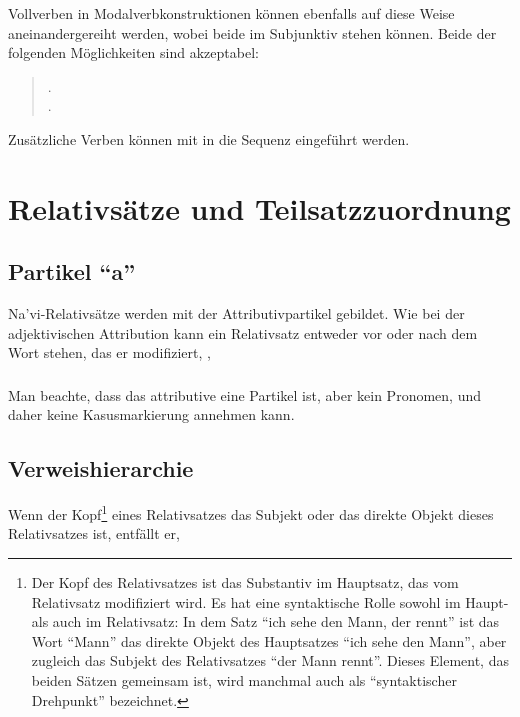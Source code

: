 Vollverben in Modalverbkonstruktionen können ebenfalls auf diese Weise aneinandergereiht werden, wobei beide im Subjunktiv stehen können. Beide der folgenden Möglichkeiten sind akzeptabel:

\begin{quotation}
	\noindent{} . \\
	\noindent{} .
\end{quotation}

\noindent Zusätzliche Verben können mit  in die Sequenz eingeführt werden. 

\section{Relativsätze und Teilsatzzuordnung}
\subsection{Partikel ``a''} Na'vi-Relativsätze werden mit der Attributivpartikel  gebildet.\label{syn:a} Wie bei der adjektivischen Attribution kann ein Relativsatz entweder vor oder nach dem Wort stehen, das er modifiziert,  ,  

\subsubsection{} Man beachte, dass das attributive  eine Partikel ist, aber kein Pronomen, und daher keine Kasusmarkierung annehmen kann.

\subsection{Verweishierarchie} Wenn der Kopf\footnote{Der Kopf des Relativsatzes ist das Substantiv im Hauptsatz, das vom Relativsatz modifiziert wird. Es hat eine syntaktische Rolle sowohl im Haupt- als auch im Relativsatz: In dem Satz ``ich sehe den Mann, der rennt'' ist das Wort ``Mann'' das direkte Objekt des Hauptsatzes ``ich sehe den Mann'', aber zugleich das Subjekt des Relativsatzes ``der Mann rennt''. Dieses Element, das beiden Sätzen gemeinsam ist, wird manchmal auch als ``syntaktischer Drehpunkt'' bezeichnet.} eines Relativsatzes das Subjekt oder das direkte Objekt dieses Relativsatzes ist, entfällt er,

